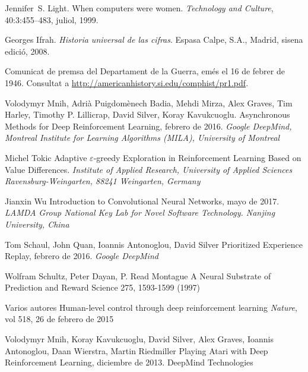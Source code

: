 \documentclass[11pt,spanish,listoffigures,listoftables]{tfgetsinf}
\begin{document}
\begin{thebibliography}{10}

   Jennifer~S. Light.
   \newblock When computers were women.
   \newblock \textit{Technology and Culture}, 40:3:455--483, juliol, 1999.

   Georges Ifrah.
   \newblock \textit{Historia universal de las cifras}.
   \newblock Espasa Calpe, S.A., Madrid, sisena edició, 2008.

   Comunicat de premsa del Departament de la Guerra, 
   emés el 16 de febrer de 1946. 
   \newblock Consultat a 
   \url{http://americanhistory.si.edu/comphist/pr1.pdf}.
   
	Volodymyr Mnih, Adrià Puigdomènech Badia, Mehdi Mirza, Alex Graves, Tim Harley, Timothy P. Lillicrap, David Silver, Koray Kavukcuoglu.
	\newblock Asynchronous Methods for Deep Reinforcement Learning,
	febrero de 2016.
	\newblock \textit {Google DeepMind, Montreal Institute for Learning Algorithms (MILA), University of Montreal}
	
	Michel Tokic
	\newblock Adaptive $\varepsilon$-greedy Exploration in Reinforcement Learning Based on Value Differences.
	\newblock \textit {Institute of Applied Research, University of Applied Sciences Ravensburg-Weingarten, 88241 Weingarten, Germany}
	
	Jianxin Wu
	\newblock Introduction to Convolutional Neural Networks,
	mayo de 2017.
	\newblock \textit {LAMDA Group \newblock National Key Lab for Novel Software Technology. Nanjing University, China}
	
	Tom Schaul, John Quan, Ioannis Antonoglou, David Silver
	\newblock Prioritized Experience Replay,
	febrero de 2016.
	\newblock \textit {Google DeepMind}
	
	 Wolfram Schultz, Peter Dayan, P. Read Montague
	 \newblock A Neural Substrate of Prediction and Reward
	 Science 275, 1593-1599 (1997)
	 
	Varios autores
	\newblock Human-level control through deep reinforcement learning
	\newblock \textit{Nature}, vol 518, 26 de febrero de 2015
	
	Volodymyr Mnih, Koray Kavukcuoglu, David Silver, Alex Graves, Ioannis Antonoglou, Daan Wierstra, Martin Riedmiller
	\newblock Playing Atari with Deep Reinforcement Learning, diciembre de 2013.
	\newblock DeepMind Technologies


\end{thebibliography}
\end{document}

